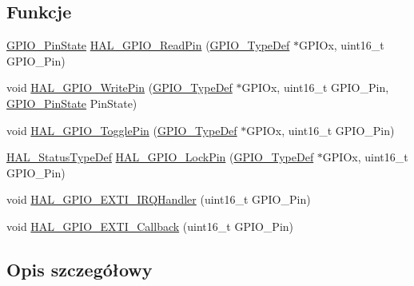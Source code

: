 \subsection*{Funkcje}
\begin{DoxyCompactItemize}
\item 
\hyperlink{group___g_p_i_o___exported___types_ga5b3ef0486b179415581eb342e0ea6b43}{G\+P\+I\+O\+\_\+\+Pin\+State} \hyperlink{group___g_p_i_o___exported___functions___group2_gaf2b819ea6551319ddd5670db318d2e4e}{H\+A\+L\+\_\+\+G\+P\+I\+O\+\_\+\+Read\+Pin} (\hyperlink{struct_g_p_i_o___type_def}{G\+P\+I\+O\+\_\+\+Type\+Def} $\ast$G\+P\+I\+Ox, uint16\+\_\+t G\+P\+I\+O\+\_\+\+Pin)
\item 
void \hyperlink{group___g_p_i_o___exported___functions___group2_gaf4b97bdf533a02f51ef696d43b6da5c4}{H\+A\+L\+\_\+\+G\+P\+I\+O\+\_\+\+Write\+Pin} (\hyperlink{struct_g_p_i_o___type_def}{G\+P\+I\+O\+\_\+\+Type\+Def} $\ast$G\+P\+I\+Ox, uint16\+\_\+t G\+P\+I\+O\+\_\+\+Pin, \hyperlink{group___g_p_i_o___exported___types_ga5b3ef0486b179415581eb342e0ea6b43}{G\+P\+I\+O\+\_\+\+Pin\+State} Pin\+State)
\item 
void \hyperlink{group___g_p_i_o___exported___functions___group2_gaf5e0c89f752de5cdedcc30db068133f6}{H\+A\+L\+\_\+\+G\+P\+I\+O\+\_\+\+Toggle\+Pin} (\hyperlink{struct_g_p_i_o___type_def}{G\+P\+I\+O\+\_\+\+Type\+Def} $\ast$G\+P\+I\+Ox, uint16\+\_\+t G\+P\+I\+O\+\_\+\+Pin)
\item 
\hyperlink{stm32f4xx__hal__def_8h_a63c0679d1cb8b8c684fbb0632743478f}{H\+A\+L\+\_\+\+Status\+Type\+Def} \hyperlink{group___g_p_i_o___exported___functions___group2_gad03c868b4a4fb25883c1bb86d0c7e9ca}{H\+A\+L\+\_\+\+G\+P\+I\+O\+\_\+\+Lock\+Pin} (\hyperlink{struct_g_p_i_o___type_def}{G\+P\+I\+O\+\_\+\+Type\+Def} $\ast$G\+P\+I\+Ox, uint16\+\_\+t G\+P\+I\+O\+\_\+\+Pin)
\item 
void \hyperlink{group___g_p_i_o___exported___functions___group2_gaa5de1ec4ebdd47e3e2b786224adaa9d0}{H\+A\+L\+\_\+\+G\+P\+I\+O\+\_\+\+E\+X\+T\+I\+\_\+\+I\+R\+Q\+Handler} (uint16\+\_\+t G\+P\+I\+O\+\_\+\+Pin)
\item 
void \hyperlink{group___g_p_i_o___exported___functions___group2_ga0cd91fd3a9608559c2a87a8ba6cba55f}{H\+A\+L\+\_\+\+G\+P\+I\+O\+\_\+\+E\+X\+T\+I\+\_\+\+Callback} (uint16\+\_\+t G\+P\+I\+O\+\_\+\+Pin)
\end{DoxyCompactItemize}


\subsection{Opis szczegółowy}


